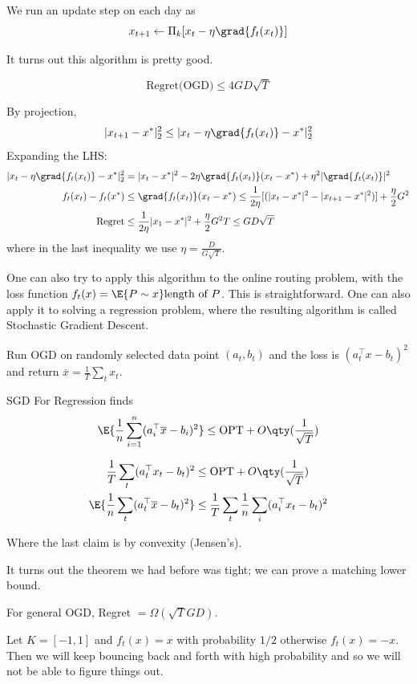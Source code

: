 \begin{algothm}
    We run an update step on each day as
    \[ x_{t + 1} \gets \Pi_k [x_t - \eta \grad{f_t(x_t)}]\]
\end{algothm}
It turns out this algorithm is pretty good.
\begin{theorem}
    \[ \text{Regret(OGD)} \le 4 GD \sqrt{T} \]
    \begin{proof*}
        By projection,
        \[|x_{t + 1} - x^*|_2^2 \le |x_t - \eta \grad{f_t(x_t)} - x^*|_2^2\]
        Expanding the LHS:
        \begin{align*}
            |x_t - \eta \grad{f_t(x_t)} - x^*|_2^2 &= |x_t - x^*|^2 - 2 \eta \grad{f_t(x_t)} (x_t - x^*) + \eta^2 |\grad{f_t(x_t)}|^2 \\
            f_t(x_t) - f_t(x^*) &\le \grad{f_t(x_t)} (x_t - x^*) \le \frac{1}{2\eta}[(|x_t - x^*|^2 - |x_{t + 1} - x^*|^2)] + \frac{\eta}{2} G^2 \\
            \text{Regret} &\le \frac{1}{2\eta} |x_1 - x^*|^2 + \frac{\eta}{2} G^2 T \le GD\sqrt{T}
        \end{align*}
        where in the last inequality we use $\eta = \frac{D}{G\sqrt{T}}$.
    \end{proof*}
\end{theorem}
One can also try to apply this algorithm to the online routing problem, with the loss function $f_t(x) = \E{P \sim x} \text{length of } P$.
This is straightforward.
One can also apply it to solving a regression problem, where the resulting algorithm is called Stochastic Gradient Descent.
\begin{algothm}
    Run OGD on randomly selected data point $(a_t, b_t)$ and the loss is $(a_t^{\top} x - b_t)^2$
    and return $\overline{x} = \frac{1}{T} \sum_t x_t$.
\end{algothm}
\begin{theorem}
    SGD For Regression finds
    \[ \E{\frac{1}{n} \sum_{i = 1}^n (a_i^{\top} \overline{x} - b_i)^2} \le \text{OPT} + O\qty(\frac{1}{\sqrt{T}}) \]
    \begin{proof*}
        \begin{align*}
            \frac{1}{T} \sum_t (a_t^{\top} x_t - b_t)^2 &\le \text{OPT} + O\qty(\frac{1}{\sqrt{T}}) \\
            \E{\frac{1}{n} \sum_t (a_t^{\top} \overline{x} - b_t)^2} &\le \frac{1}{T} \sum_t \frac{1}{n} \sum_{i} (a_i^{\top} x_t - b_t)^2
        \end{align*}
    \end{proof*}
    Where the last claim is by convexity (Jensen's).
\end{theorem}
It turns out the theorem we had before was tight; we can prove a matching lower bound.
\begin{theorem}
    For general OGD, Regret $ = \Omega(\sqrt{T} GD)$.
    \begin{proof*}[Sketch]

        Let $K = [-1, 1]$ and $f_t(x) = x$ with probability $1/2$ otherwise $f_t(x) = -x$. Then we will
        keep bouncing back and forth with high probability and so we will not be able to figure things out.
    \end{proof*}
\end{theorem}
